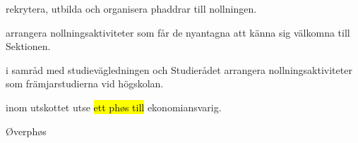 \documentclass[../_main/handlingar.tex]{subfiles}
\begin{document}
\begin{attsatser}
\begin{emptylist}
        \begin{dashlist}
            \item rekrytera, utbilda och organisera phaddrar till nollningen.
            \item arrangera nollningsaktiviteter som får de nyantagna att känna sig välkomna till Sektionen.
            \item i samråd med studievägledningen och Studierådet arrangera nollningsaktiviteter som främjarstudierna vid högskolan.
            \item inom utskottet utse \hl{ett phøs till} ekonomiansvarig.
        \end{dashlist}
        \changenote
    \end{emptylist}

\end{attsatser}

\begin{signatures}{1}
    \ist
    \signature{\oph}{Øverphøs}
\end{signatures}
\end{document}
